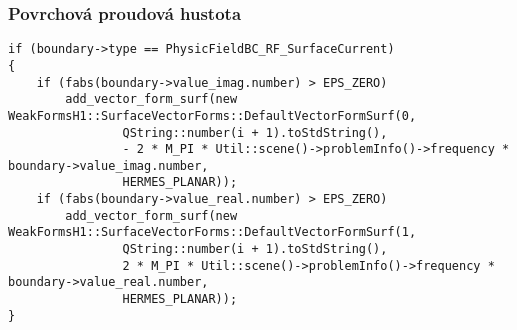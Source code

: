\subsubsection*{Povrchová proudová hustota}
\begin{verbatim}
if (boundary->type == PhysicFieldBC_RF_SurfaceCurrent)
{
    if (fabs(boundary->value_imag.number) > EPS_ZERO)
        add_vector_form_surf(new WeakFormsH1::SurfaceVectorForms::DefaultVectorFormSurf(0,
                QString::number(i + 1).toStdString(),
                - 2 * M_PI * Util::scene()->problemInfo()->frequency * boundary->value_imag.number,
                HERMES_PLANAR));
    if (fabs(boundary->value_real.number) > EPS_ZERO)
        add_vector_form_surf(new WeakFormsH1::SurfaceVectorForms::DefaultVectorFormSurf(1,
                QString::number(i + 1).toStdString(),
                2 * M_PI * Util::scene()->problemInfo()->frequency * boundary->value_real.number,
                HERMES_PLANAR));
}
\end{verbatim}

